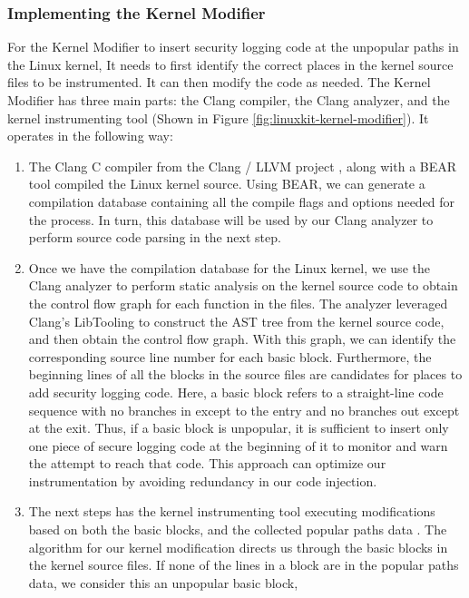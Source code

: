 \subsubsection{Implementing the Kernel Modifier}
\label{sec.design.implementation.kernel_modifier}
For the Kernel Modifier to insert security logging code at the unpopular paths in the Linux kernel, It needs to first identify the correct places in the kernel source files to be instrumented. 
It can then modify the code as needed. The Kernel Modifier has three main parts: the Clang compiler, the Clang analyzer, and the kernel instrumenting tool (Shown in Figure \ref{fig:linuxkit-kernel-modifier}).
It operates in the following way: 
\begin{enumerate}
	\item The Clang C compiler from the Clang / LLVM project \cite{llvm}, along with a BEAR \cite{bear} tool compiled the Linux kernel source. Using BEAR, 
	we can generate a compilation database containing all the compile flags and options needed for the process. 
	In turn, this database will be used by our Clang analyzer to perform source code parsing in the next step.
	\item Once we have the compilation database for the Linux kernel,  we use the Clang analyzer to perform static analysis on the kernel source code to obtain the control flow graph for each function in the files. 
	The analyzer leveraged Clang’s LibTooling \cite{clang-libtooling} to construct the AST tree from the kernel source code, and then obtain the control flow graph. 
	With this graph, we can identify the corresponding source line number for each basic block. Furthermore, the beginning lines of all the blocks in the source files are candidates for places to add security logging code. 
	Here, a basic block refers to a straight-line code sequence with no branches in except to the entry and no branches out except at the exit. 
	Thus, if a basic block is unpopular, it is sufficient to insert only one piece of secure logging code at the beginning of it to monitor and warn the attempt to reach that code. 
	This approach can optimize our instrumentation by  avoiding redundancy in our code injection.  
	\item The next steps has the kernel instrumenting tool executing modifications based on both the basic blocks, and the collected popular paths data . 
	The algorithm for our kernel modification directs us through the basic blocks in the kernel source files. If none of the lines in a block are in the popular paths data, we consider this an unpopular basic block, 

\end{enumerate}
